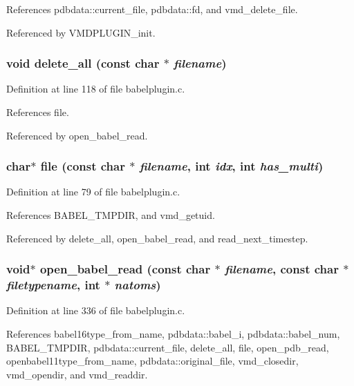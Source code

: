 References pdbdata::current\_\-file, pdbdata::fd, and vmd\_\-delete\_\-file.

Referenced by VMDPLUGIN\_\-init.
\subsubsection{\setlength{\rightskip}{0pt plus 5cm}void delete\_\-all (const char $\ast$ {\em filename})\hspace{0.3cm}{\tt  [static]}}\label{babelplugin_8c_a10}




Definition at line 118 of file babelplugin.c.

References file.

Referenced by open\_\-babel\_\-read.
\subsubsection{\setlength{\rightskip}{0pt plus 5cm}char$\ast$ file (const char $\ast$ {\em filename}, int {\em idx}, int {\em has\_\-multi})\hspace{0.3cm}{\tt  [static]}}\label{babelplugin_8c_a9}




Definition at line 79 of file babelplugin.c.

References BABEL\_\-TMPDIR, and vmd\_\-getuid.

Referenced by delete\_\-all, open\_\-babel\_\-read, and read\_\-next\_\-timestep.
\subsubsection{\setlength{\rightskip}{0pt plus 5cm}void$\ast$ open\_\-babel\_\-read (const char $\ast$ {\em filename}, const char $\ast$ {\em filetypename}, int $\ast$ {\em natoms})\hspace{0.3cm}{\tt  [static]}}\label{babelplugin_8c_a14}




Definition at line 336 of file babelplugin.c.

References babel16type\_\-from\_\-name, pdbdata::babel\_\-i, pdbdata::babel\_\-num, BABEL\_\-TMPDIR, pdbdata::current\_\-file, delete\_\-all, file, open\_\-pdb\_\-read, openbabel11type\_\-from\_\-name, pdbdata::original\_\-file, vmd\_\-closedir, vmd\_\-opendir, and vmd\_\-readdir.

